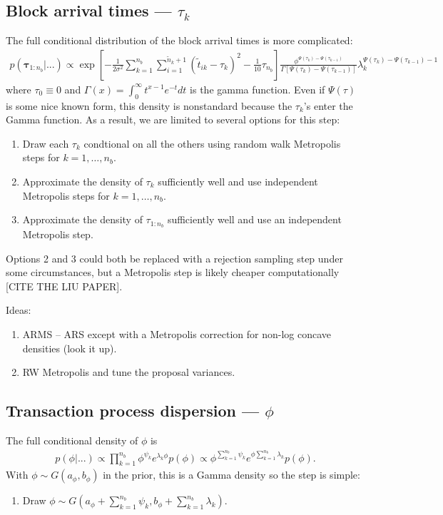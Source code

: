 \documentclass{article}
\begin{document}
\subsection{Block arrival times --- $\tau_k$}
The full conditional distribution of the block arrival times is more complicated:
\begin{align*}
p(\bm{\tau}_{1:n_{b}}|...) \propto \exp\left[-\frac{1}{2\sigma^2}\sum_{k=1}^{n_{b}}\sum_{i=1}^{\tilde{n}_k+1}\left(\tilde{t}_{ik} - \tau_k\right)^2 - \frac{1}{10}\tau_{n_{b}}\right]\frac{\phi^{\Psi(\tau_k) - \Psi(\tau_{k-1})}}{\Gamma\left[\Psi(\tau_k) - \Psi(\tau_{k-1})\right]}\lambda_k^{\Psi(\tau_k)-\Psi(\tau_{k-1}) - 1}
\end{align*}
where $\tau_0\equiv0$ and $\Gamma(x) = \int_0^\infty t^{x-1}e^{-t}dt$ is the gamma function. Even if $\Psi(\tau)$ is some nice known form, this density is nonstandard because the $\tau_k$'s enter the Gamma function. As a result, we are limited to several options for this step:
\begin{enumerate}
\item Draw each $\tau_k$ condtional on all the others using random walk Metropolis steps for $k=1,\dots,n_{b}$.
\item Approximate the density of $\tau_k$ sufficiently well and use independent Metropolis steps for $k=1,\dots,n_{b}$.
\item Approximate the density of $\tau_{1:n_{b}}$ sufficiently well and use an independent Metropolis step.
\end{enumerate}
Options 2 and 3 could both be replaced with a rejection sampling step under some circumstances, but a Metropolis step is likely cheaper computationally [CITE THE LIU PAPER]. 

Ideas:
\begin{enumerate}
\item ARMS -- ARS except with a Metropolis correction for non-log concave densities (look it up).
\item RW Metropolis and tune the proposal variances.
\end{enumerate}

\subsection{Transaction process dispersion --- $\phi$}
The full conditional density of $\phi$ is
\begin{align*}
p(\phi|...) \propto \prod_{k=1}^{n_{b}}\phi^{\psi_k}e^{\lambda_k\phi}p(\phi) \propto \phi^{\sum_{k=1}^{n_{b}}\psi_k}e^{\phi\sum_{k=1}^{n_{b}}\lambda_k}p(\phi).
\end{align*}
With $\phi \sim G(a_\phi, b_\phi)$ in the prior, this is a Gamma density so the step is simple:
\begin{enumerate}
\item Draw $\phi \sim G\left(a_\phi + \sum_{k=1}^{n_{b}}\psi_k, b_{\phi} + \sum_{k=1}^{n_{b}}\lambda_k \right)$.
\end{enumerate}
\end{document}
